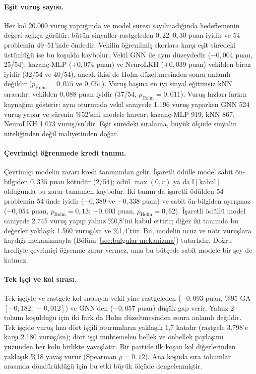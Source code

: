 \documentclass[pdflatex,sn-basic]{sn-jnl}
\begin{document}
\paragraph{Eşit vuruş sayısı.}
Her kol 20.000 vuruş yaptığında ve model süresi sayılmadığında hedeflemenin değeri açıkça görülür:
bütün sinyaller rastgeleden $0{,}22$--$0{,}30$ puan iyidir ve 54 problemin 49--51'inde öndedir.
Vekilin öğrenilmiş skorlara karşı eşit süredeki üstünlüğü ise bu koşulda kaybolur. Vekil GNN ile
aynı düzeydedir ($-0{,}004$ puan, 25/54); kazanç-MLP ($+0{,}074$ puan) ve NeuroLKH ($+0{,}039$ puan)
vekilden biraz iyidir (32/54 ve 40/54), ancak ikisi de Holm düzeltmesinden sonra anlamlı değildir
($p_{\mathrm{Holm}}=0{,}075$ ve $0{,}051$). Vuruş başına en iyi sinyal eğitimsiz kNN sırasıdır: vekilden
$0{,}088$ puan iyidir (37/54, $p_{\mathrm{Holm}}=0{,}011$).
Vuruş hızları farkın kaynağını gösterir: aynı oturumda vekil saniyede 1.196 vuruş yaparken GNN 524
vuruş yapar ve sürenin \%52'sini modele harcar; kazanç-MLP 919, kNN 867, NeuroLKH 1.073 vuruş/sn'dir.
Eşit süredeki sıralama, büyük ölçüde sinyalin niteliğinden değil maliyetinden doğar.

\paragraph{Çevrimiçi öğrenmede kredi tanımı.}
Çevrimiçi modelin zararı kredi tanımından gelir. İşaretli ödülle model sabit ön-bilgiden $0{,}335$
puan kötüdür (2/54); ödül $\max(0,r)$ ya da $\mathbb{I}[\text{kabul}]$ olduğunda bu zarar tamamen
kaybolur. İki tanım da işaretli ödülden 54 problemin 54'ünde iyidir ($-0{,}389$ ve $-0{,}338$ puan) ve
sabit ön-bilgiden ayrışmaz ($-0{,}054$ puan, $p_{\mathrm{Holm}}=0{,}13$; $-0{,}003$ puan,
$p_{\mathrm{Holm}}=0{,}62$). İşaretli ödüllü model saniyede 2.745 vuruş yapıp yalnız \%0,8'ini kabul
ettirir; diğer iki tanımda bu değerler yaklaşık 1.560 vuruş/sn ve \%1,4'tür. Bu, modelin ucuz ve
nötr vuruşlara kaydığı mekanizmayla (Bölüm~\ref{sec:bulgular-mekanizma}) tutarlıdır. Doğru krediyle
çevrimiçi öğrenme zarar vermez, ama bu bütçede sabit modele bir şey de katmaz.

\paragraph{Tek işçi ve kol sırası.}
Tek işçiyle ve rastgele kol sırasıyla vekil yine rastgeleden ($-0{,}093$ puan, \%95 GA
$[-0{,}182;\,-0{,}012]$) ve GNN'den ($-0{,}057$ puan) düşük gap verir. Yalnız 2 tohum koşulduğu için iki
fark da Holm düzeltmesinden sonra anlamlı değildir. Tek işçide vuruş hızı dört işçili oturumların
yaklaşık 1,7 katıdır (rastgele 3.798'e karşı 2.180 vuruş/sn); dört işçi muhtemelen bellek ve
önbellek paylaşımı yüzünden her kolu birlikte yavaşlatır. Bir partide ilk koşan kol diğerlerinden yaklaşık
\%18 yavaş vurur (Spearman $\rho=0{,}12$). Ana koşuda sıra tohumlar arasında döndürüldüğü için bu
etki büyük ölçüde dengelenmiştir.
\end{document}
